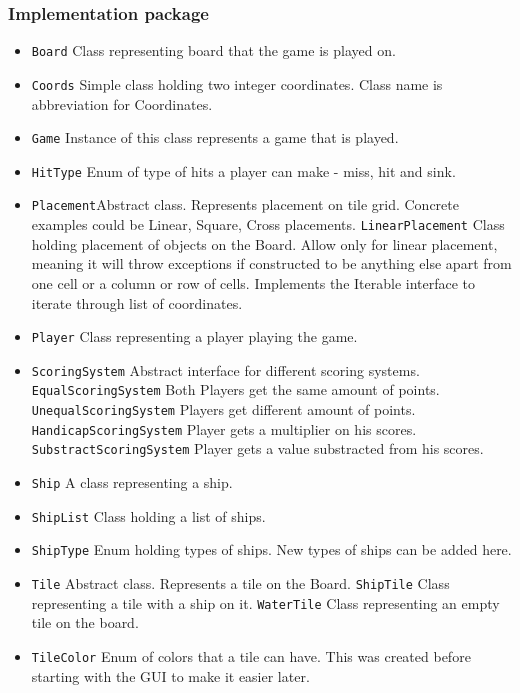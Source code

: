 \documentclass[]{article}
\begin{document}
\subsubsection{Implementation package}
\begin{itemize}
	\itemsep0em 
	\item \texttt{Board} Class representing board that the game is played on.
	\item \texttt{Coords} Simple class holding two integer coordinates. Class name is abbreviation for Coordinates.
	\item \texttt{Game} Instance of this class represents a game that is played.
	\item \texttt{HitType} Enum of type of hits a player can make - miss, hit and sink.
	\item \texttt{Placement}Abstract class. Represents placement on tile grid. Concrete examples could be Linear, Square, Cross placements.
	\subitem \texttt{LinearPlacement} Class holding placement of objects on the Board. Allow only for linear placement, meaning it will throw exceptions if constructed to be anything else apart from one cell or a column or row of cells. Implements the Iterable interface to iterate through list of coordinates.
	\item \texttt{Player} Class representing a player playing the game.
	\item \texttt{ScoringSystem} Abstract interface for different scoring systems.
	\subitem \texttt{EqualScoringSystem} Both Players get the same amount of points.
	\subitem \texttt{UnequalScoringSystem} Players get different amount of points.
	\subsubitem \texttt{HandicapScoringSystem} Player gets a multiplier on his scores.
	\subsubitem \texttt{SubstractScoringSystem} Player gets a value substracted from his scores.
	\item \texttt{Ship} A class representing a ship.
	\item \texttt{ShipList} Class holding a list of ships.
	\item \texttt{ShipType} Enum holding types of ships. New types of ships can be added here.
	\item \texttt{Tile} Abstract class. Represents a tile on the Board.
	\subitem \texttt{ShipTile} Class representing a tile with a ship on it.
	\subitem \texttt{WaterTile} Class representing an empty tile on the board.
	\item \texttt{TileColor} Enum of colors that a tile can have. This was created before starting with the GUI to make it easier later.
\end{itemize}
\end{document}
